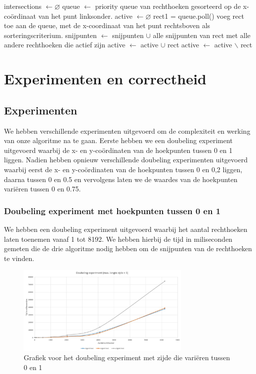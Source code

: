 \documentclass[11pt,a4paper,titlepage]{article}
\begin{document}
		\begin{algorithm}[H]
			\caption{}
			\begin{algorithmic}[1]
				\State intersections $\gets \varnothing $
				\State queue $\gets$ priority queue van rechthoeken gesorteerd op de x-coördinaat van het punt linksonder.
				\State active $\gets \varnothing$
				\State rect1 = queue.poll()
				\State voeg rect toe aan de queue, met de x-coordinaat van het punt rechtsboven als sorteringscriterium.
				\State snijpunten $\gets$ snijpunten $\cup$ alle snijpunten van rect met alle andere rechthoeken die actief zijn
				\State active $\gets$ active $\cup$ rect
				\Else
				\State active $\gets$ active $\backslash$ rect
				\EndIf
				\EndWhile
			\end{algorithmic}
		\end{algorithm}
	
	\section{Experimenten en correctheid}
		\subsection{Experimenten}
		We hebben verschillende experimenten uitgevoerd om de complexiteit en werking van onze algoritme na te gaan. Eerste hebben we een doubeling experiment uitgevoerd waarbij de x- en y-coördinaten van de hoekpunten tussen 0 en 1 liggen.  Nadien hebben opnieuw verschillende doubeling experimenten uitgevoerd waarbij eerst de x- en y-coördinaten van de hoekpunten tussen 0 en 0,2 liggen, daarna tussen 0 en 0.5 en vervolgens laten we de waardes van de hoekpunten variëren tussen 0 en 0.75.
			\subsubsection{Doubeling experiment met hoekpunten tussen 0 en 1}
				We hebben een doubeling experiment uitgevoerd waarbij het aantal rechthoeken laten toenemen vanaf 1 tot 8192.  We hebben hierbij de tijd in miliseconden gemeten die de drie algoritme nodig hebben om de snijpunten van de rechthoeken te vinden.
				\begin{figure}[H]
				\centering
				\includegraphics[width=0.75\textwidth]{zijde1.JPG}
				\caption{\label{fig:convR}Grafiek voor het doubeling experiment met zijde die variëren tussen 0 en 1}
				\end{figure}
\end{document}
